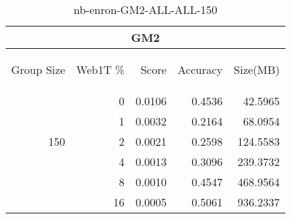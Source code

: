 \begin{center}
\begin{table}[htbp]
\begin{tabular}{ | r | r | r | r | r |}
\hline
\multicolumn{5}{|c|}{GM2}\\
\hline
\begin{sideways}Group Size\end{sideways} & \begin{sideways}Web1T \%\end{sideways} & \begin{sideways}Score\end{sideways} & \begin{sideways}Accuracy\end{sideways} & \begin{sideways}Size(MB)\end{sideways}\\
\hline
\multirow{5}{*}{150}
 & 0 & 0.0106 & 0.4536 & 42.5965\\ \cline{2-5}
 & 1 & 0.0032 & 0.2164 & 68.0954\\ \cline{2-5}
 & 2 & 0.0021 & 0.2598 & 124.5583\\ \cline{2-5}
 & 4 & 0.0013 & 0.3096 & 239.3732\\ \cline{2-5}
 & 8 & 0.0010 & 0.4547 & 468.9564\\ \cline{2-5}
 & 16 & 0.0005 & 0.5061 & 936.2337\\ \cline{2-5}
\hline
\end{tabular}
\caption{nb-enron-GM2-ALL-ALL-150}
\label{table:nb-enron-GM2-ALL-ALL-150}
\end{table}
\end{center}

